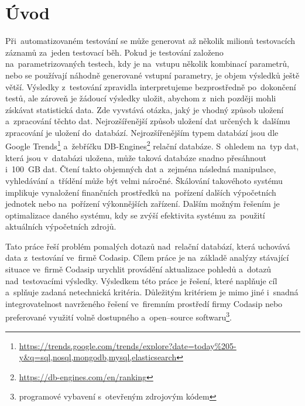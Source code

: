 

\chapter{Úvod}
\label{chapter:uvod}
Při~automatizovaném testování se může generovat až několik milionů testovacích záznamů za~jeden testovací běh.
Pokud je testování založeno na~parametrizovaných testech, kdy je na~vstupu několik kombinací parametrů, nebo se
používají náhodně generované vstupní parametry, je objem výsledků ještě větší. Výsledky z~testování zpravidla
interpretujeme bezprostředně po~dokončení testů, ale zároveň je žádoucí výsledky uložit, abychom z~nich později mohli získávat statistická data. Zde vyvstává otázka, jaký je vhodný způsob uložení a~zpracování těchto dat. Nejrozšířenější způsob uložení dat určených k~dalšímu zpracování je uložení do~databází. Nejrozšířenějším typem databází jsou dle Google Trends\footnote{\href{https://trends.google.com/trends/explore?date=today\%205-y\&q=sql,nosql,mongodb,mysql,elasticsearch}{https://trends.google.com/trends/explore?date=today\%205-y\&q=sql,nosql,mongodb,mysql,elasticsearch}} a~žebříčku DB-Engines\footnote{\href{https://db-engines.com/en/ranking}{https://db-engines.com/en/ranking}} relační databáze. S~ohledem na~typ dat, která jsou v~databázi uložena, může taková databáze snadno přesáhnout
i~100~GB dat. Čtení takto objemných dat a~zejména následná manipulace, vyhledávání a~třídění může být velmi
náročné. Škálování takovéhoto systému implikuje vynaložení finančních prostředků na~pořízení dalších výpočetních
jednotek nebo na~pořízení výkonnějších zařízení. Dalším možným řešením je optimalizace daného systému, kdy se zvýší efektivita systému za~použití aktuálních výpočetních zdrojů.

Tato práce řeší problém pomalých dotazů nad~relační databází, která uchovává data z~testování ve~firmě Codasip. Cílem práce je na~základě analýzy stávající situace ve~firmě Codasip urychlit provádění aktualizace pohledů a~dotazů nad~testovacími výsledky. Výsledkem této práce je řešení, které naplňuje cíl a~splňuje zadaná netechnická kritéria. Důležitým kritériem je mimo jiné i~snadná integrovatelnost navrženého řešení ve~firemním prostředí firmy Codasip nebo preferované využití volně dostupného a~open--source softwaru\footnote{programové vybavení s~otevřeným zdrojovým kódem}.

